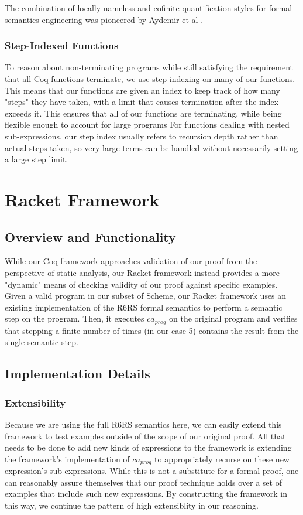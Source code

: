 The combination of locally nameless and cofinite quantification styles for formal semantics engineering was pioneered by Aydemir et al \cite{aydemir_engineering_2008}.

\subsubsection{Step-Indexed Functions}
To reason about non-terminating programs while still satisfying the requirement that all Coq functions terminate, we use step indexing on many of our functions. This means that our functions are given an index to keep track of how many "steps" they have taken, with a limit that causes termination after the index exceeds it. This ensures that all of our functions are terminating, while being flexible enough to account for large programs For functions dealing with nested sub-expressions, our step index usually refers to recursion depth rather than actual steps taken, so very large terms can be handled without necessarily setting a large step limit.
\section{Racket Framework}\label{sxn:rkt}
\subsection{Overview and Functionality}
While our Coq framework approaches validation of our proof from the perspective of static analysis, our Racket framework instead provides a more "dynamic" means of checking validity of our proof against specific examples. Given a valid program in our subset of Scheme, our Racket framework uses an existing implementation of the R6RS formal semantics to perform a semantic step on the program. Then, it executes $ca_{prog}$ on the original program and verifies that stepping a finite number of times (in our case 5) contains the result from the single semantic step. 
\subsection{Implementation Details}
\subsubsection{Extensibility}
Because we are using the full R6RS semantics here, we can easily extend this framework to test examples outside of the scope of our original proof. All that needs to be done to add new kinds of expressions to the framework is extending the framework's implementation of $ca_{prog}$ to appropriately recurse on these new expression's sub-expressions. While this is not a substitute for a formal proof, one can reasonably assure themselves that our proof technique holds over a set of examples that include such new expressions. By constructing the framework in this way, we continue the pattern of high extensiblity in our reasoning.
